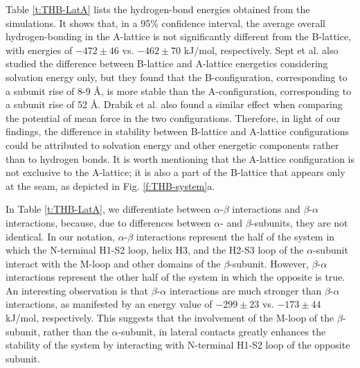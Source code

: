 \documentclass[11pt]{report}
\begin{document}
Table \ref{t:THB-LatA} 
lists the hydrogen-bond energies obtained from
the simulations. It shows that, in a 95\% confidence interval, the average overall hydrogen-bonding in the A-lattice is not significantly different from the B-lattice, with energies of $-472\pm46$ vs. $-462\pm70$ kJ/mol, respectively. Sept et al.
\cite{Sept2003} also studied the difference between B-lattice and A-lattice energetics considering solvation energy only, but they found that the B-configuration, corresponding to a subunit rise of 8-9 \r{A}, is more stable than the A-configuration,
corresponding to a subunit rise of 52 \r{A}. 
Drabik et al.
\cite{Drabik2007}
also found a similar effect when comparing the potential of mean force in the two configurations. Therefore, in light of our findings, the difference in stability between B-lattice and A-lattice configurations could be attributed to solvation energy and other energetic components rather than to hydrogen bonds. It is worth mentioning that the A-lattice configuration is not exclusive to the A-lattice; it is also a part of the B-lattice that appears only at the seam, as depicted in Fig.
\ref{f:THB-system}a.

In Table 
\ref{t:THB-LatA}, 
we differentiate between $\alpha$-$\beta$ interactions and
$\beta$-$\alpha$ interactions, because, due to differences between $\alpha$- and $\beta$-subunits, they are not identical. In our notation, $\alpha$-$\beta$ interactions represent the half of the system in which the N-terminal H1-S2 loop, helix H3, and the H2-S3 loop of the $\alpha$-subunit interact with the M-loop and other domains of the $\beta$-subunit. However, $\beta$-$\alpha$ interactions represent the other half of the system in which the opposite is true. An interesting observation is that $\beta$-$\alpha$ interactions are much stronger than $\beta$-$\alpha$ interactions, as manifested by an energy value of $-299 \pm23$ vs. $-173\pm44$ kJ/mol, respectively. 
This suggests that the involvement of the M-loop of the $\beta$-subunit, rather than the $\alpha$-subunit, in lateral contacts greatly enhances the stability of the system by interacting with N-terminal H1-S2 loop of the opposite subunit.
\end{document}
